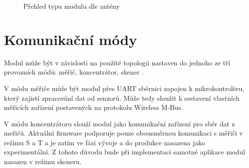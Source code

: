 \begin{figure}[!ht]
    \centering
			\hspace*{5mm}
			\hspace*{5mm}
		\caption{Přehled typu modulu dle antény \cite{ModulIQRF}}
		\label{ObrazekAnteny}
		\vspace{-20pt}
\end{figure}

\section{Komunikační módy}

Modul může být v závislosti na použité topologii nastaven do jednoho ze tří provozních módů: měřič, koncentrátor, skener \cite{ModulIQRF}. 

V módu měřiče může být modul přes UART sběrnici zapojen k mikrokontroléru, který zajistí zpracování dat od senzorů. Může tedy sloužit k sestavení vlastních měřicích zařízení postavených na protokolu Wireless M-Bus.

V módu koncentrátoru slouží modul jako komunikační zařízení pro sběr dat z meřičů. Aktuální firmware podporuje pouze obousměrnou komunikaci s měřiči v režimu S a T a je zatím ve fázi vývoje a do produkce nasazena jako experimentální. Z tohoto důvodu bude při implementaci samotné aplikace modul nasazen v režimu skeneru.

